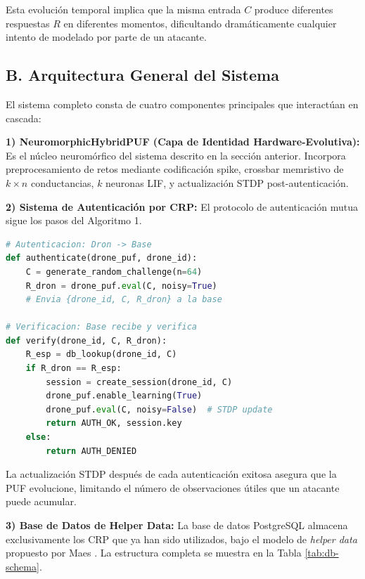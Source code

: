 Esta evolución temporal implica que la misma entrada $C$ produce diferentes respuestas $R$ en diferentes momentos, dificultando dramáticamente cualquier intento de modelado por parte de un atacante.

\subsection*{B. Arquitectura General del Sistema}

El sistema completo consta de cuatro componentes principales que interactúan en cascada:

\textbf{1) NeuromorphicHybridPUF (Capa de Identidad Hardware-Evolutiva):} Es el núcleo neuromórfico del sistema descrito en la sección anterior. Incorpora preprocesamiento de retos mediante codificación spike, crossbar memristivo de $k \times n$ conductancias, $k$ neuronas LIF, y actualización STDP post-autenticación.

\textbf{2) Sistema de Autenticación por CRP:} El protocolo de autenticación mutua sigue los pasos del Algoritmo 1.

\begin{lstlisting}[language=Python, caption=Protocolo de autenticacion PUF neuromorfica, label=alg:auth]
# Autenticacion: Dron -> Base
def authenticate(drone_puf, drone_id):
    C = generate_random_challenge(n=64)
    R_dron = drone_puf.eval(C, noisy=True)
    # Envia {drone_id, C, R_dron} a la base

# Verificacion: Base recibe y verifica
def verify(drone_id, C, R_dron):
    R_esp = db_lookup(drone_id, C)
    if R_dron == R_esp:
        session = create_session(drone_id, C)
        drone_puf.enable_learning(True)
        drone_puf.eval(C, noisy=False)  # STDP update
        return AUTH_OK, session.key
    else:
        return AUTH_DENIED
\end{lstlisting}

La actualización STDP después de cada autenticación exitosa asegura que la PUF evolucione, limitando el número de observaciones útiles que un atacante puede acumular.

\textbf{3) Base de Datos de Helper Data:} La base de datos PostgreSQL almacena exclusivamente los CRP que ya han sido utilizados, bajo el modelo de \textit{helper data} propuesto por Maes \cite{maes2012puf}. La estructura completa se muestra en la Tabla \ref{tab:db-schema}.

